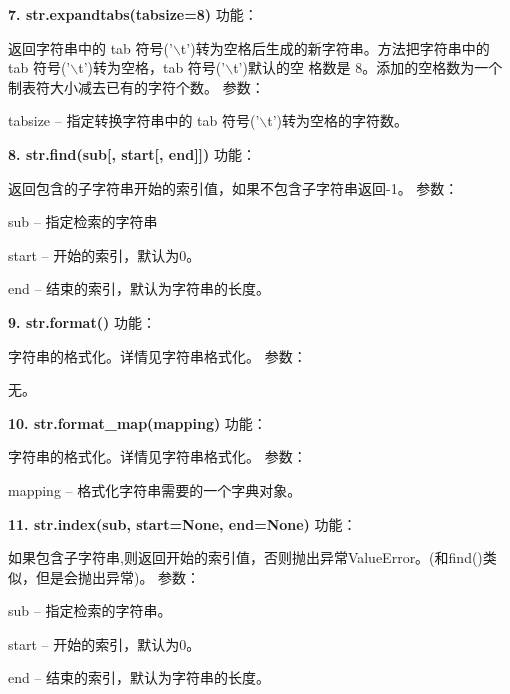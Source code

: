 \documentclass{book}
\begin{document}
\begin{CJK}{UTF8}{gbsn}
\noindent \textbf{7. str.expandtabs(tabsize=8)} \newline
功能：\par 返回字符串中的 tab 符号('$\backslash$t')转为空格后生成的新字符串。方法把字符串中的 tab 符号('$\backslash$t')转为空格，tab 符号('$\backslash$t')默认的空       格数是 8。添加的空格数为一个制表符大小减去已有的字符个数。\newline
参数：\par tabsize -- 指定转换字符串中的 tab 符号('$\backslash$t')转为空格的字符数。          
\newline

\noindent \textbf{8. str.find(sub[, start[, end]])} \newline
功能：\par 返回包含的子字符串开始的索引值，如果不包含子字符串返回-1。\newline
参数：\par sub -- 指定检索的字符串
     \par start -- 开始的索引，默认为0。
     \par end -- 结束的索引，默认为字符串的长度。
\newline

\noindent \textbf{9. str.format()} \newline
功能：\par 字符串的格式化。详情见字符串格式化。\newline
参数：\par 无。
\newline

\newpage
\noindent \textbf{10. str.format\_map(mapping)} \newline
功能：\par 字符串的格式化。详情见字符串格式化。\newline
参数：\par mapping -- 格式化字符串需要的一个字典对象。
\newline

\noindent \textbf{11. str.index(sub, start=None, end=None)} \newline
功能：\par 如果包含子字符串,则返回开始的索引值，否则抛出异常ValueError。(和find()类似，但是会抛出异常)。\newline
参数：\par sub -- 指定检索的字符串。
     \par start -- 开始的索引，默认为0。
     \par end -- 结束的索引，默认为字符串的长度。
\newline



\end{CJK}
\end{document}
